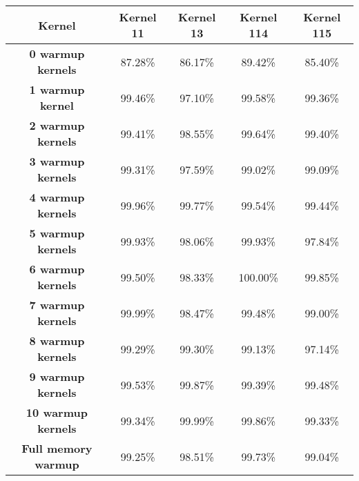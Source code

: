 \begin{tabular}{ |c|c|c|c|c |}
    \hline
    \textbf{Kernel} & Kernel 11 & Kernel 13 & Kernel 114 & Kernel 115 \\
    \hline
    \hline
    \textbf{0 warmup kernels} & 87.28\% & 86.17\% & 89.42\% & 85.40\% \\
    \textbf{1 warmup kernel} & 99.46\% & 97.10\% & 99.58\% & 99.36\% \\
    \textbf{2 warmup kernels} & 99.41\% & 98.55\% & 99.64\% & 99.40\% \\
    \textbf{3 warmup kernels} & 99.31\% & 97.59\% & 99.02\% & 99.09\% \\
    \textbf{4 warmup kernels} & 99.96\% & 99.77\% & 99.54\% & 99.44\% \\
    \textbf{5 warmup kernels} & 99.93\% & 98.06\% & 99.93\% & 97.84\% \\
    \textbf{6 warmup kernels} & 99.50\% & 98.33\% & 100.00\% & 99.85\% \\
    \textbf{7 warmup kernels} & 99.99\% & 98.47\% & 99.48\% & 99.00\% \\
    \textbf{8 warmup kernels} & 99.29\% & 99.30\% & 99.13\% & 97.14\% \\
    \textbf{9 warmup kernels} & 99.53\% & 99.87\% & 99.39\% & 99.48\% \\
    \textbf{10 warmup kernels} & 99.34\% & 99.99\% & 99.86\% & 99.33\% \\
    \textbf{Full memory warmup} & 99.25\% & 98.51\% & 99.73\% & 99.04\% \\
    \hline
\end{tabular}
